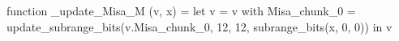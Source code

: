 function _update_Misa_M (v, x) = let v = { v with Misa_chunk_0 = update_subrange_bits(v.Misa_chunk_0, 12, 12, subrange_bits(x, 0, 0)) } in
  v
